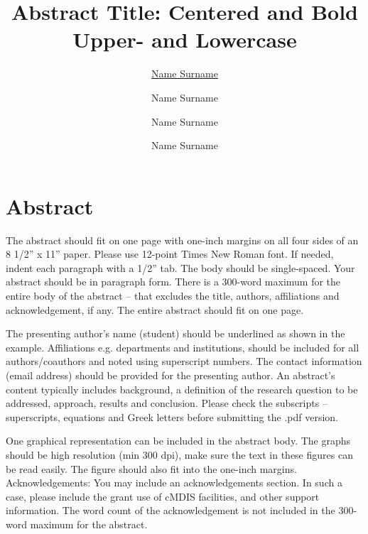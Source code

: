 \documentclass[12pt]{article}
\title{Abstract Title: Centered and Bold Upper- and Lowercase}
\author[1]{\underline{Name Surname}}
\author[2]{Name Surname}
\author[1,2]{Name Surname}
\author[1,3]{Name Surname}
\affil[1]{Department, Research Institute/University, City, Postal Code}
\affil[2]{Department, Research Institute/University, City, Postal Code}
\affil[3]{Department, Research Institute/University, City, Postal Code}
\begin{document}
\maketitle
\section*{\centering\large Abstract}
The abstract should fit on one page with one-inch margins on all four sides of an 8 1/2” x 11” paper. Please use 12-point Times New Roman font. If needed, indent each paragraph with a  1/2” tab. The body should be single-spaced. Your abstract should be in paragraph form. There is a 300-word maximum for the entire body of the abstract -- that excludes the title, authors, affiliations and acknowledgement, if any. The entire abstract should fit on one page. 

The presenting author’s name (student) should be underlined as shown in the example. Affiliations e.g. departments and institutions, should be included for all authors/coauthors and noted using superscript numbers. The contact information (email address) should be provided for the presenting author. 
An abstract’s content typically includes background, a definition of the research question to be addressed, approach, results and conclusion. Please check the subscripts -- superscripts, equations and Greek letters before submitting the .pdf version.

One graphical representation can be included in the abstract body. The graphs should be high resolution (min 300 dpi), make sure the text in these figures can be read easily. The figure should also fit into the one-inch margins.\\

\noindent Acknowledgements: You may include an acknowledgements section. In such a case, please include the grant use of cMDIS facilities, and other support information. The word count of the acknowledgement is not included in the 300-word maximum for the abstract.
\end{document}
